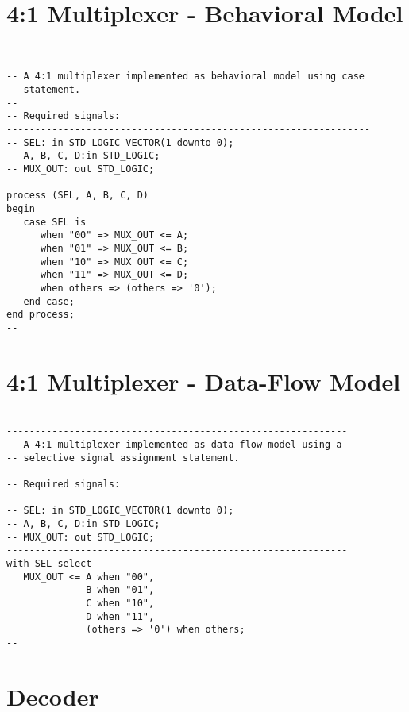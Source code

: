\section{4:1 Multiplexer - Behavioral Model}

\noindent
\begin{minipage}{0.99\linewidth}
\begin{lstlisting}

----------------------------------------------------------------
-- A 4:1 multiplexer implemented as behavioral model using case
-- statement. 
--
-- Required signals: 
----------------------------------------------------------------
-- SEL: in STD_LOGIC_VECTOR(1 downto 0);
-- A, B, C, D:in STD_LOGIC;
-- MUX_OUT: out STD_LOGIC;
----------------------------------------------------------------
process (SEL, A, B, C, D)
begin
   case SEL is
      when "00" => MUX_OUT <= A;
      when "01" => MUX_OUT <= B;
      when "10" => MUX_OUT <= C;
      when "11" => MUX_OUT <= D;
      when others => (others => '0');
   end case;
end process;
--
\end{lstlisting}
\end{minipage}

\section{4:1 Multiplexer - Data-Flow Model}

\noindent
\begin{minipage}{0.99\linewidth}
\begin{lstlisting}

------------------------------------------------------------
-- A 4:1 multiplexer implemented as data-flow model using a
-- selective signal assignment statement. 
--
-- Required signals: 
------------------------------------------------------------
-- SEL: in STD_LOGIC_VECTOR(1 downto 0);
-- A, B, C, D:in STD_LOGIC;
-- MUX_OUT: out STD_LOGIC;
------------------------------------------------------------
with SEL select
   MUX_OUT <= A when "00", 
              B when "01", 
              C when "10", 
              D when "11", 
              (others => '0') when others;
--
\end{lstlisting}
\end{minipage}

\section{Decoder}

